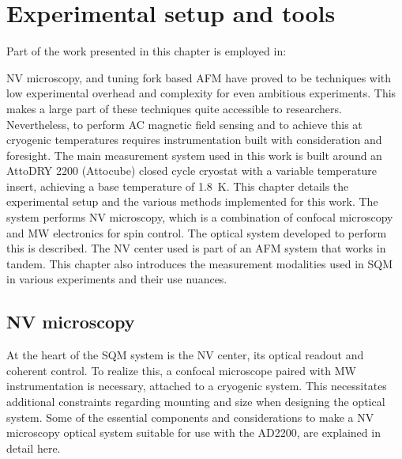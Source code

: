 \chapter{Experimental setup and tools}\label{sec:setup}
\begin{flushright}
    \begin{minipage}{0.85\textwidth}
        \small
        Part of the work presented in this chapter is employed in: \\
    \end{minipage}
\end{flushright}

\gls{NV} microscopy\cite{stegemannModularLowcost3D2023}, and tuning fork based \gls{AFM}\cite{edwardsFastHighresolutionAtomic1997} have proved to be techniques with low experimental overhead and complexity for even ambitious experiments. This makes a large part of these techniques quite accessible to researchers. Nevertheless, to perform AC magnetic field sensing and to achieve this at cryogenic temperatures requires instrumentation built with consideration and foresight. The main measurement system used in this work is built around an AttoDRY 2200 (Attocube) closed cycle cryostat with a variable temperature insert, achieving a base temperature of \qty{1.8}{\kelvin}. This chapter details the experimental setup and the various methods implemented for this work. The system performs \gls{NV} microscopy, which is a combination of confocal microscopy and \gls{MW} electronics for spin control. The optical system developed to perform this is described. The \gls{NV} center used is part of an \gls{AFM} system that works in tandem. This chapter also introduces the measurement modalities used in \gls{SQM} in various experiments and their use nuances.

\section{NV microscopy}

At the heart of the \gls{SQM} system is the \gls{NV} center, its optical readout and coherent control. To realize this, a confocal microscope paired with \gls{MW} instrumentation is necessary, attached to a cryogenic system. This necessitates additional constraints regarding mounting and size when designing the optical system. Some of the essential components and considerations to make a \gls{NV} microscopy optical system suitable for use with the AD2200, are explained in detail here.

